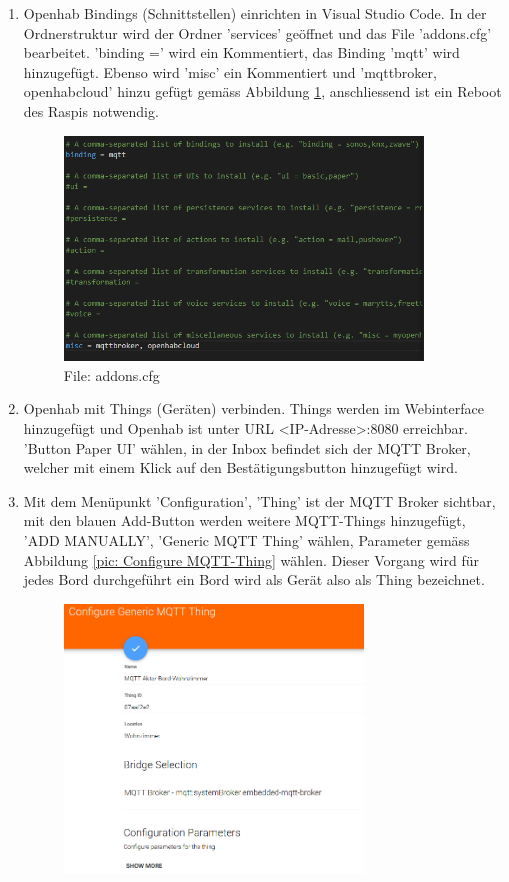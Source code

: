 \begin{enumerate}
	\item Openhab Bindings (Schnittstellen) einrichten in Visual Studio Code. In der Ordnerstruktur wird der Ordner 'services' geöffnet und das File 'addons.cfg' bearbeitet. 'binding =' wird ein Kommentiert, das Binding 'mqtt' wird hinzugefügt. Ebenso wird 'misc' ein Kommentiert und 'mqttbroker, openhabcloud' hinzu gefügt gemäss Abbildung \ref{pic: addons.cfg}, anschliessend ist ein Reboot des Raspis notwendig.  
	   \begin{figure}[H]
		\centering
		\includegraphics[width=0.9\textwidth]{graphics/addpnscfg.PNG}
		\caption{File: addons.cfg} 	
		\label{pic: addons.cfg}
	\end{figure} 
\item Openhab mit Things (Geräten) verbinden. Things werden im Webinterface hinzugefügt und Openhab ist unter URL <IP-Adresse>:8080 erreichbar. 'Button Paper UI' wählen, in der Inbox befindet sich der MQTT Broker, welcher mit einem Klick auf den Bestätigungsbutton hinzugefügt wird. 
\item Mit dem Menüpunkt 'Configuration', 'Thing' ist der MQTT Broker sichtbar, mit den blauen Add-Button werden weitere MQTT-Things hinzugefügt, 'ADD MANUALLY', 'Generic MQTT Thing' wählen, Parameter gemäss Abbildung \ref{pic: Configure MQTT-Thing}  wählen. Dieser Vorgang wird für jedes Bord durchgeführt ein Bord wird als Gerät also als Thing bezeichnet.
	   \begin{figure}[H]
	\centering
	\includegraphics[width=0.75\textwidth]{graphics/MQTT-Thing.PNG}

\end{figure}
\end{enumerate}
